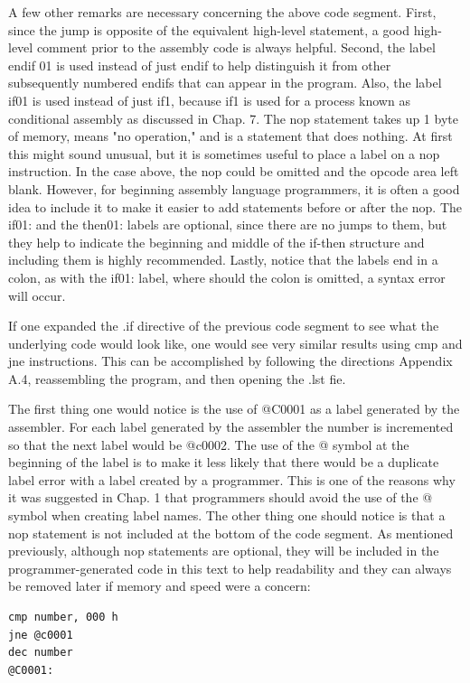 \documentclass[10pt]{book}
\begin{document}
A few other remarks are necessary concerning the above code segment. First, since the jump is opposite of the equivalent high-level statement, a good high-level comment prior to the assembly code is always helpful. Second, the label endif 01 is used instead of just endif to help distinguish it from other subsequently numbered endifs that can appear in the program. Also, the label if01 is used instead of just if1, because if1 is used for a process known as conditional assembly as discussed in Chap. 7. The nop statement takes up 1 byte of memory, means "no operation," and is a statement that does nothing. At first this might sound unusual, but it is sometimes useful to place a label on a nop instruction. In the case above, the nop could be omitted and the opcode area left blank. However, for beginning assembly language programmers, it is often a good idea to include it to make it easier to add statements before or after the nop. The if01: and the then01: labels are optional, since there are no jumps to them, but they help to indicate the beginning and middle of the if-then structure and including them is highly recommended. Lastly, notice that the labels end in a colon, as with the if01: label, where should the colon is omitted, a syntax error will occur.

If one expanded the .if directive of the previous code segment to see what the underlying code would look like, one would see very similar results using cmp and jne instructions. This can be accomplished by following the directions Appendix A.4, reassembling the program, and then opening the .lst fie.

The first thing one would notice is the use of @C0001 as a label generated by the assembler. For each label generated by the assembler the number is incremented so that the next label would be @c0002. The use of the @ symbol at the beginning of the label is to make it less likely that there would be a duplicate label error with a label created by a programmer. This is one of the reasons why it was suggested in Chap. 1 that programmers should avoid the use of the @ symbol when creating label names. The other thing one should notice is that a nop statement is not included at the bottom of the code segment. As mentioned previously, although nop statements are optional, they will be included in the programmer-generated code in this text to help readability and they can always be removed later if memory and speed were a concern:
\begin{verbatim}
cmp number, 000 h
jne @c0001
dec number
@C0001:
\end{verbatim}
\end{document}
